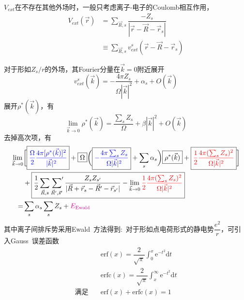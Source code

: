 \documentclass{article}      %
\newcommand{\upcite}[1]{\hspace{0ex}\textsuperscript{\cite{#1}}} %
\begin{document}
$V_{ext}$在不存在其他外场时，一般只考虑离子-电子的\textrm{Coulomb}相互作用，
	\begin{equation}
		\begin{aligned}
			V_{ext}(\vec r)&=\sum_{\vec R,s}\dfrac{-Z_s}{|\vec r-\vec R-\vec r_s|}\\
			&\equiv\sum_{\vec R,s}v_{ext}^s(\vec r-\vec R-\vec r_s)
		\end{aligned}
		\label{eq:Ion-ele_Coulomb}
	\end{equation}

对于形如$Z_s/r$的外场，其\textrm{Fourier}分量在$\vec k=0$附近展开
	\begin{equation}
		v_{ext}^s(\vec k)=-\dfrac{4\pi Z_s}{\Omega|\vec k|^2}+\alpha_s+O(\vec k)
		\label{eq:V_ext}
	\end{equation}
展开$\rho^{\ast}(\vec k)$，有
	\begin{equation}
		\lim_{\vec k\rightarrow 0}\rho^{\ast}(\vec k)=\dfrac{\sum_sZ_s}{\Omega}+\beta|\vec k|^2+O(\vec k)
		\label{eq:rho_ext}
	\end{equation}
去掉高次项，有
\begin{equation}
	\begin{aligned}
		\lim_{\vec k\rightarrow 0}&\bigg[\boxed{\textcolor{blue}{\dfrac{\Omega}2\dfrac{4\pi[\rho^{\ast}(\vec k)]^2}{|\vec k|^2}}}+\boxed{\Omega}\bigg(\boxed{\textcolor{blue}{-\dfrac{4\pi\sum_sZ_s}{\Omega|\vec k|^2}}}+\sum_s\alpha_s\bigg)\boxed{\rho^{\ast}(\vec k)}+\boxed{\textcolor{red}{\dfrac12\dfrac{4\pi(\sum_sZ_s)^2}{\Omega|\vec k|^2}}}\bigg]\\
		&+\boxed{\dfrac12\sum_{\vec R,s}\sideset{}{^{\prime}}\sum_{\vec R^{\prime},\vec s^{\prime}}\dfrac{Z_sZ_{s^{\prime}}}{|\vec R+\vec r_s-\vec R^{\prime}-\vec r_{s^{\prime}}|}-\lim_{\vec k\rightarrow0}\textcolor{red}{\dfrac12\dfrac{4\pi(\sum_sZ_s)^2}{\Omega|\vec k|^2}}}\\
		=&\sum_s\alpha_s\sum_sZ_s+\textcolor{magenta}{E_{\mathrm{Ewald}}}
	\end{aligned}
	\label{eq:V_ext_exp2}
\end{equation}
其中离子间排斥势采用\textrm{Ewald~}方法得到\upcite{Born-Huang}:~对于形如点电荷形式的静电势$\dfrac{e^2}r$，可引入\textrm{Gauss~}误差函数
\begin{equation}
	\begin{aligned}
		&\mathrm{erf}(x)=\dfrac2{\sqrt{\pi}}\int_0^{x}\mathrm{e}^{-t^2}\mathrm{d}t\\
		&\mathrm{erfc}(x)=\dfrac2{\sqrt{\pi}}\int_x^{\infty}\mathrm{e}^{-t^2}\mathrm{d}t\\
		\mbox{满足}\quad&\mathrm{erf}(x)+\mathrm{erfc}(x)=1
	\end{aligned}
	\label{eq:err_fun}
\end{equation}
\end{document}
